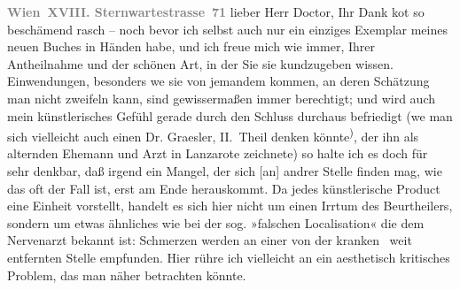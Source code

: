 \pstart
           \textcolor{gray}{\textbf{Wien XVIII. Sternwartestrasse 71}}\pend
           \vspace{0.5em}
\pstart
           lieber Herr Doctor, Ihr Dank ko{\geminationm}t so beschämend rasch – noch bevor
               ich selbst auch nur ein einziges Exemplar meines neuen Buches in Händen habe, und ich freue mich wie immer, Ihrer
               Antheilnahme und der schönen Art, in der Sie sie kundzugeben wissen. Einwendungen,
               besonders we{\geminationn} sie von jemandem kommen, an deren Schätzung man nicht zweifeln kann,
               sind gewissermaßen immer berechtigt; und wird \introOben{}auch\introOben{} mein künstlerisches
               Gefühl gerade durch den Schluss durchaus befriedigt (we{\geminationn} man sich vielleicht auch
               einen Dr. Graesler, II. Theil denken könnte\substVorne{}\textsuperscript{)}\substDazwischen{},\substHinten{} der ihn als alternden Ehemann und Arzt in Lanzarote zeichnete) {\pb}so halte
               ich es \introOben{}doch\introOben{} für sehr denkbar, daß irgend ein Mangel, der sich
                   {[}an{]} andrer Stelle finden mag, wie das oft der Fall ist, erst
               am Ende herauskommt. Da jedes künstlerische Product eine Einheit vorstellt, handelt
               es sich hier nicht um einen Irrtum des Beurtheilers, sondern um etwas ähnliches wie
               bei der sog. »falschen Localisation« die dem Nervenarzt bekannt ist: Schmerzen werden
               an einer von der kranken  weit entfernten
               Stelle empfunden. Hier rühre ich vielleicht an ein aesthetisch kritisches Problem,
               das man näher betrachten könnte.\pend
           
